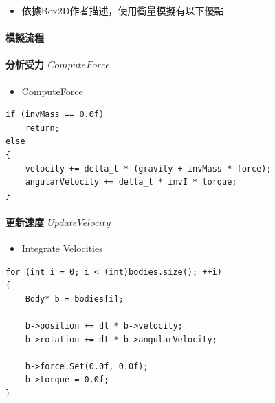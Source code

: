 \begin{itemize}
    \item{依據Box2D作者描述，使用衝量模擬有以下優點}
\end{itemize}


\paragraph{模擬流程}
\paragraph{分析受力 \(Compute Force\)}

\begin{itemize}
    \item{ComputeForce}
\end{itemize}

\begin{lstlisting}
if (invMass == 0.0f)
    return;
else
{
    velocity += delta_t * (gravity + invMass * force);
    angularVelocity += delta_t * invI * torque;
}
\end{lstlisting}


\paragraph{更新速度 \(Update Velocity\)}

\begin{itemize}
    \item{Integrate Velocities}
\end{itemize}

\begin{lstlisting}
for (int i = 0; i < (int)bodies.size(); ++i)
{
    Body* b = bodies[i];

    b->position += dt * b->velocity;
    b->rotation += dt * b->angularVelocity;

    b->force.Set(0.0f, 0.0f);
    b->torque = 0.0f;
}
\end{lstlisting}

